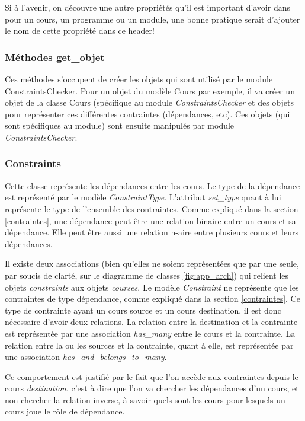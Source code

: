 Si à l'avenir, on découvre une autre propriétés qu'il est important d'avoir dans pour un cours, un programme ou un module, une bonne pratique serait d'ajouter le nom de cette propriété dans ce header!

\subsubsection{Méthodes get\_objet}
Ces méthodes s'occupent de créer les objets qui sont utilisé par le module ConstraintsChecker. Pour un objet du modèle Cours par exemple, il va créer un objet de la classe Cours (spécifique au module \textit{ConstraintsChecker} et des objets pour représenter ces différentes contraintes (dépendances, etc). Ces objets (qui sont spécifiques au module) sont ensuite manipulés par module \textit{ConstraintsChecker}.

\subsubsection{Constraints}
Cette classe représente les dépendances entre les cours. Le type de la dépendance est représenté par le modèle \textit{ConstraintType}. L'attribut \textit{set\_type} quant à lui représente le type de l'ensemble des contraintes. Comme expliqué dans la section \ref{contraintes}, une dépendance peut être une relation binaire entre un cours et sa dépendance. Elle peut être aussi une relation n-aire entre plusieurs cours et leurs dépendances.

Il existe deux associations (bien qu'elles ne soient représentées que par une seule, par soucis de clarté, sur le diagramme de classes \ref{fig:app_arch}) qui relient les objets \textit{constraints} aux objets \textit{courses}. Le modèle \textit{Constraint} ne représente que les contraintes de type dépendance, comme expliqué dans la section \ref{contraintes}. Ce type de contrainte ayant un cours source et un cours destination, il est donc nécessaire d'avoir deux relations.  La relation entre la destination et la contrainte est représentée par une association \textit{has\_many} entre le cours et la contrainte. La relation entre la ou les sources et la contrainte, quant à elle, est représentée par une association \textit{has\_and\_belongs\_to\_many}. 

Ce comportement est justifié par le fait que l'on accède aux contraintes depuis le cours \textit{destination}, c'est à dire que l'on va chercher les dépendances d'un cours, et non chercher la relation inverse, à savoir quels sont les cours pour lesquels un cours joue le rôle de dépendance.

